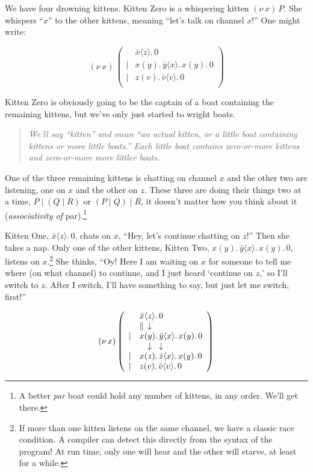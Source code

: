 \documentclass[10pt,oneside,x11names]{article}
\newcommand\napping    [0]{0}
\newcommand\chatting   [3]{\bar{#1}\langle{#2}\rangle{}.\,#3}
\newcommand\listening  [3]{#1(#2).\,#3}
\newcommand\two        [2]{#1\mathrel{\vert}{#2}}
\newcommand\whispering [2]{(\nu\,#1)\,{#2}}
\newcommand{\kitOne}{\chatting{x}{z}{\napping}}
\newcommand{\kitTwo}{\listening{x}{y}{\chatting{y}{x}{\listening{x}{y}{\napping}}}}
\newcommand{\kitThree}{\listening{z}{v}{\chatting{v}{v}{\napping}}}
\newcommand{\wkit}{\whispering{x}{P}}
\theoremstyle{definition}
\theoremstyle{warning}
\begin{document}
We have four drowning kittens. Kitten Zero is a whispering
kitten \(\wkit\). She whispers ``\(x\)'' to the other kittens,
meaning ``let's talk on channel \(x\)!'' One might write:

\begin{equation}
\whispering{x}{\left(
\begin{array}{clll}
 {}     & \kitOne \\
 \vert  & \kitTwo \\
 \vert  & \kitThree \\
\end{array}\right)}
\end{equation}

Kitten Zero is obviously going to be the captain of a boat
containing the remaining kittens, but we've only just started to
wright boats.

\begin{quote}
\emph{We'll say ``kitten'' and mean ``an actual kitten, or a little boat
containing kittens or more little boats.'' Each little boat contains zero-or-more kittens and zero-or-more more littler boats.}
\end{quote}

One of the three remaining kittens is chatting on channel \(x\) and
the other two are listening, one on \(x\) and the other on \(z\).
These three are doing their things two at a time,
\(\two{P}{(\two{Q}{R})}\) or \(\two{(\two{P}{Q})}{R}\), it doesn't
matter how you think about it (\emph{associativity of} par).\footnote{A
better \emph{par} boat could hold any number of kittens, in any order.
We'll get there.}

Kitten One, \(\kitOne\), chats on \(x\), ``Hey, let's continue chatting
on \(z\)!'' Then she takes a nap. Only one of the other kittens,
Kitten Two, \(\kitTwo\), listens on \(x\).\footnote{If more than one
kitten listens on the same channel, we have a classic race
condition. A compiler can detect this directly from the syntax of
the program! At run time, only one will hear and the other will
starve, at least for a while.} She thinks, ``Oy! Here I am waiting
on \(x\) for someone to tell me where (on what channel) to continue,
and I just heard `continue on \(z\),' so I'll switch to \(z\). After I
switch, I'll have something to say, but just let me switch,
first!''

\begin{equation}
\whispering{x}{\left(
\begin{array}{clll}
 {}     & \kitOne \\
 {}     & \parallel \hspace{4.5pt} \downarrow \\
 \vert  & \kitTwo \\
 {}     & \hspace{9.5pt}\downarrow\hspace{8.5pt}\downarrow \\
 \vert  & \listening{x}{z}{\chatting{z}{x}{\listening{x}{y}{\napping}}} \\
 \vert  & \kitThree \\
\end{array}\right)}
\end{equation}
\end{document}
